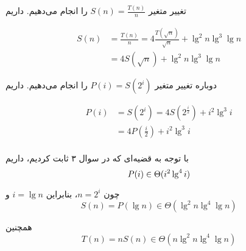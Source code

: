 \documentclass{article}
\begin{document}
	تغییر متغیر
	$S(n) = \frac{T(n)}{n}$
	را انجام می‌دهیم. داریم

	\begin{align*}
		S(n) &= \frac{T(n)}{n} = 4\frac{T(\sqrt{n})}{\sqrt{n}} + \lg^2 n \lg^3 \lg n \\
		&= 4S(\sqrt{n}) + \lg^2 n \lg^3 \lg n
	\end{align*}

	دوباره تغییر متغیر
	$P(i) = S(2^i)$
	را انجام می‌دهیم. داریم

	\begin{align*}
		P(i) &= S(2^i) = 4S(2^{\frac{i}{2}}) + i^2 \lg^3 i \\
		&= 4P(\frac{i}{2}) + i^2 \lg^3 i \\
	\end{align*}

	با توجه به قضیه‌ای که در سوال ۳ ثابت کردیم، داریم
	\begin{equation*}
		P(i) \in \Theta(i^2 \lg^4 i) \\
	\end{equation*}

	چون
	$n = 2^i$،
	بنابراین
	$i = \lg n$
	و
	\begin{equation*}
		S(n) = P(\lg n) \in \Theta(\lg^2 n \lg^4 \lg n)
	\end{equation*}

	همچنین
	\begin{equation*}
		T(n) = nS(n) \in \Theta(n \lg^2 n \lg^4 \lg n)
	\end{equation*}
\end{document}
